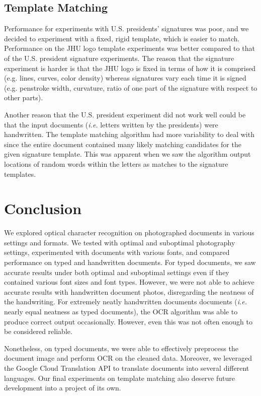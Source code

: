\documentclass[11pt,letterpaper]{article}
\begin{document}
\subsection{Template Matching}

Performance for experiments with U.S. presidents' signatures was poor, and we decided to experiment with a fixed, rigid template, which is easier to match. Performance on the JHU logo template experiments was better compared to that of the U.S. president signature experiments. The reason that the signature experiment is harder is that the JHU logo is fixed in terms of how it is comprised (e.g. lines, curves, color density) whereas signatures vary each time it is signed (e.g. penstroke width, curvature, ratio of one part of the signature with respect to other parts).

Another reason that the U.S. president experiment did not work well could be that the input documents (\textit{i.e.} letters written by the presidents) were handwritten. The template matching algorithm had more variability to deal with since the entire document contained many likely matching candidates for the given signature template. This was apparent when we saw the algorithm output locations of random words within the letters as matches to the signature templates.

\section{Conclusion}

We explored optical character recognition on photographed documents in various settings and formats. We tested with optimal and suboptimal photography settings, experimented with documents with various fonts, and compared performance on typed and handwritten documents. For typed documents, we saw accurate results under both optimal and suboptimal settings even if they contained various font sizes and font types. However, we were not able to achieve accurate results with handwritten document photos, disregarding the neatness of the handwriting. For extremely neatly handwritten documents documents (\textit{i.e.} nearly equal neatness as typed documents), the OCR algorithm was able to produce correct output occasionally. However, even this was not often enough to be considered reliable. 

Nonetheless, on typed documents, we were able to effectively preprocess the document image and perform OCR on the cleaned data. Moreover, we leveraged the Google Cloud Translation API to translate documents into several different languages. Our final experiments on template matching also deserve future development into a project of its own.
\end{document}
